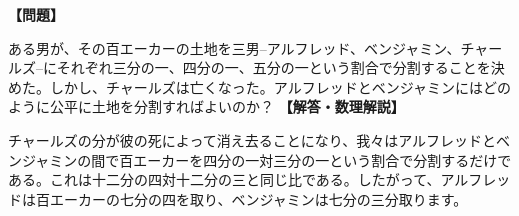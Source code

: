 \documentclass[10pt,a4paper,oneside,openany]{ltjsbook}
\begin{document}
\begin{tcolorbox}[colback=softblue,colframe=primaryblue,title=\textbf{第 112 問：謎の遺産 （原題: A PUZZLING LEGACY.）},arc=2mm,boxrule=1pt,breakable]
\textbf{【問題】}\par\vspace{0.3em}
ある男が、その百エーカーの土地を三男--アルフレッド、ベンジャミン、チャールズ--にそれぞれ三分の一、四分の一、五分の一という割合で分割することを決めた。しかし、チャールズは亡くなった。アルフレッドとベンジャミンにはどのように公平に土地を分割すればよいのか？
\tcblower
\textbf{【解答・数理解説】}\par\vspace{0.3em}
チャールズの分が彼の死によって消え去ることになり、我々はアルフレッドとベンジャミンの間で百エーカーを四分の一対三分の一という割合で分割するだけである。これは十二分の四対十二分の三と同じ比である。したがって、アルフレッドは百エーカーの七分の四を取り、ベンジャミンは七分の三分取ります。
\end{tcolorbox}
\end{document}
